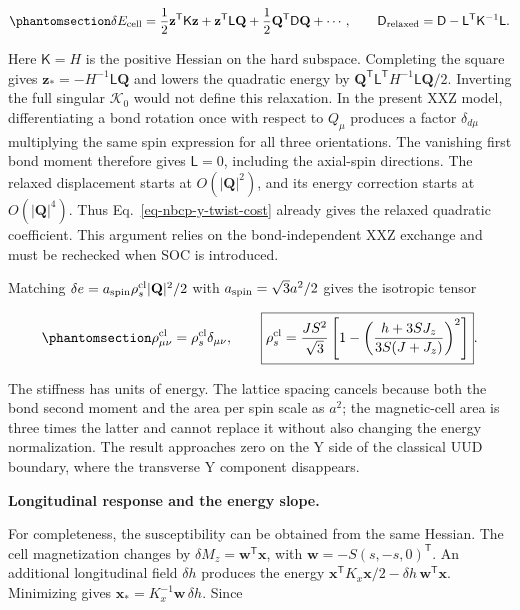 \begin{equation}\phantomsection\label{eq-nbcp-y-stiffness-relaxation}{
\delta E_{\rm cell}
=\frac12\mathbf z^{\mathsf T}\mathsf K\mathbf z
+\mathbf z^{\mathsf T}\mathsf L\mathbf Q
+\frac12\mathbf Q^{\mathsf T}\mathsf D\mathbf Q+\cdots,
\qquad
\mathsf D_{\rm relaxed}
=\mathsf D-\mathsf L^{\mathsf T}\mathsf K^{-1}\mathsf L.
}\end{equation}

Here \(\mathsf K=H\) is the positive Hessian on the hard subspace.
Completing the square gives \(\mathbf z_*=-H^{-1}\mathsf L\mathbf Q\)
and lowers the quadratic energy by
\(\mathbf Q^{\mathsf T}\mathsf L^{\mathsf T}H^{-1}\mathsf L\mathbf Q/2\).
Inverting the full singular \(\mathcal K_0\) would not define this
relaxation. In the present XXZ model, differentiating a bond rotation
once with respect to \(Q_\mu\) produces a factor \(\delta_{d\mu}\)
multiplying the same spin expression for all three orientations. The
vanishing first bond moment therefore gives \(\mathsf L=0\), including
the axial-spin directions. The relaxed displacement starts at
\(O(|\mathbf Q|^2)\), and its energy correction starts at
\(O(|\mathbf Q|^4)\). Thus Eq.~\ref{eq-nbcp-y-twist-cost} already gives
the relaxed quadratic coefficient. This argument relies on the
bond-independent XXZ exchange and must be rechecked when SOC is
introduced.

Matching \(\delta e=a_{\rm spin}\rho_s^{\rm cl}|\mathbf Q|^2/2\) with
\(a_{\rm spin}=\sqrt3a^2/2\) gives the isotropic tensor

\begin{equation}\phantomsection\label{eq-nbcp-y-classical-stiffness}{
\rho_{\mu\nu}^{\rm cl}=\rho_s^{\rm cl}\delta_{\mu\nu},
\qquad
\boxed{\rho_s^{\rm cl}
=\frac{JS^2}{\sqrt3}\left[
1-\left(\frac{h+3SJ_z}{3S(J+J_z)}\right)^2\right]}.
}\end{equation}

The stiffness has units of energy. The lattice spacing cancels because
both the bond second moment and the area per spin scale as \(a^2\); the
magnetic-cell area is three times the latter and cannot replace it
without also changing the energy normalization. The result approaches
zero on the Y side of the classical UUD boundary, where the transverse Y
component disappears.

\textbf{Longitudinal response and the energy slope.}

For completeness, the susceptibility can be obtained from the same
Hessian. The cell magnetization changes by
\(\delta M_z=\mathbf w^{\mathsf T}\mathbf x\), with
\(\mathbf w=-S(s,-s,0)^{\mathsf T}\). An additional longitudinal field
\(\delta h\) produces the energy
\(\mathbf x^{\mathsf T}K_x\mathbf x/2-\delta h\,\mathbf w^{\mathsf T}\mathbf x\).
Minimizing gives \(\mathbf x_*=K_x^{-1}\mathbf w\,\delta h\). Since

